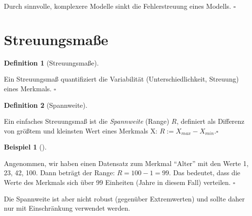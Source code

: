\documentclass[
  letterpaper,
  twoside,
  open=any]{scrbook}
\theoremstyle{definition}
\theoremstyle{definition}
\newtheorem{example}{Beispiel}[chapter]
\theoremstyle{definition}
\newtheorem{definition}{Definition}[chapter]
\theoremstyle{remark}
\begin{document}
\begin{tcolorbox}[enhanced jigsaw, colframe=quarto-callout-important-color-frame, arc=.35mm, leftrule=.75mm, bottomtitle=1mm, titlerule=0mm, colbacktitle=quarto-callout-important-color!10!white, breakable, bottomrule=.15mm, colback=white, left=2mm, rightrule=.15mm, opacityback=0, toptitle=1mm, toprule=.15mm, opacitybacktitle=0.6, title=\textcolor{quarto-callout-important-color}{\faExclamation}\hspace{0.5em}{Wichtig}, coltitle=black]

Durch sinnvolle, komplexere Modelle sinkt die Fehlerstreuung eines
Modells. \(\square\)

\end{tcolorbox}

\section{Streuungsmaße}\label{sec-streuung}

\begin{definition}[Streuungsmaße]\protect\hypertarget{def-streuungsmaße}{}\label{def-streuungsmaße}

Ein Streuungsmaß quantifiziert die Variabilität (Unterschiedlichkeit,
Streuung) eines Merkmals. \(\square\)

\end{definition}

\begin{definition}[Spannweite]\protect\hypertarget{def-range}{}\label{def-range}

Ein einfaches Streuungsmaß ist die \emph{Spannweite} (Range) \(R\),
definiert als Differenz von größtem und kleinsten Wert eines Merkmals X:
\(R := X_{max} - X_{min}. \square\)

\end{definition}

\begin{example}[]\protect\hypertarget{exm-range}{}\label{exm-range}

Angenommen, wir haben einen Datensatz zum Merkmal \enquote{Alter} mit
den Werte 1, 23, 42, 100. Dann beträgt der Range: \(R = 100 - 1 = 99\).
Das bedeutet, dass die Werte des Merkmals sich über 99 Einheiten (Jahre
in diesem Fall) verteilen. \(\square\)

\end{example}

Die Spannweite ist aber nicht robust (gegenüber Extremwerten) und sollte
daher nur mit Einschränkung verwendet werden.
\end{document}
